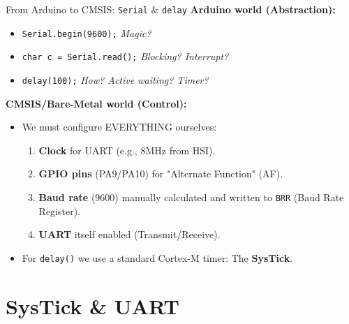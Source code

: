 \documentclass{beamer}
\begin{document}
\begin{frame}{From Arduino to CMSIS: \texttt{Serial} \& \texttt{delay}}
	\textbf{Arduino world (Abstraction):}
	\begin{itemize}
		\item \texttt{Serial.begin(9600);} \hfill \textit{Magic?}
		\item \texttt{char c = Serial.read();} \hfill \textit{Blocking? Interrupt?}
		\item \texttt{delay(100);} \hfill \textit{How? Active waiting? Timer?}
	\end{itemize}
	
	\bigskip
	\textbf{CMSIS/Bare-Metal world (Control):}
	\begin{itemize}
		\item We must configure EVERYTHING ourselves:
		\begin{enumerate}
			\item \textbf{Clock} for UART (e.g., 8MHz from HSI).
			\item \textbf{GPIO pins} (PA9/PA10) for "Alternate Function" (AF).
			\item \textbf{Baud rate} (9600) manually calculated and written to \texttt{BRR} (Baud Rate Register).
			\item \textbf{UART} itself enabled (Transmit/Receive).
		\end{enumerate}
		\item For \texttt{delay()} we use a standard Cortex-M timer: The \textbf{SysTick}.
	\end{itemize}
\end{frame}

\section{SysTick \& UART}
\end{document}
